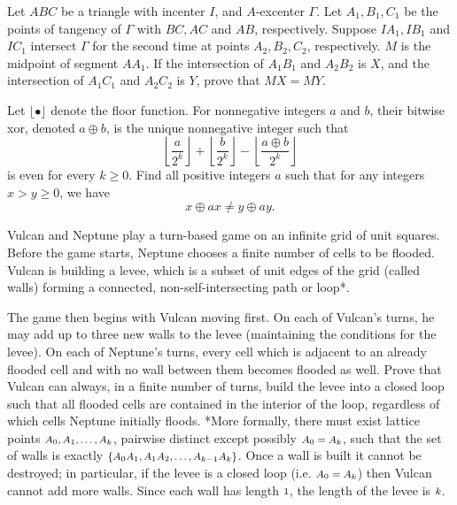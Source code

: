 \documentclass[11pt]{scrartcl}
\begin{document}
\begin{problem}[791423398948046269]
Let $ABC$ be a triangle with incenter $I$, and $A$-excenter $\Gamma$. Let $A_1,B_1,C_1$ be the points of tangency of $\Gamma$ with $BC,AC$ and $AB$, respectively. Suppose $IA_1, IB_1$ and $IC_1$ intersect $\Gamma$ for the second time at points $A_2,B_2,C_2$, respectively. $M$ is the midpoint of segment $AA_1$. If the intersection of $A_1B_1$ and $A_2B_2$ is $X$, and the intersection of $A_1C_1$ and $A_2C_2$ is $Y$, prove that $MX=MY$.
\end{problem}
\begin{problem}[3780160396229984886]
	Let $\lfloor \bullet \rfloor$ denote the floor function. For nonnegative integers $a$ and $b$, their bitwise xor, denoted $a \oplus b$, is the unique nonnegative integer such that$$ \left \lfloor \frac{a}{2^k}  \right \rfloor+ \left\lfloor\frac{b}{2^k} \right\rfloor - \left\lfloor \frac{a\oplus b}{2^k}\right\rfloor$$is even for every $k \ge 0$. Find all positive integers $a$ such that for any integers $x>y\ge 0$, we have\[ x\oplus ax \neq y \oplus ay. \]
\end{problem}
\begin{problem}[6064010778487493566]
Vulcan and Neptune play a turn-based game on an infinite grid of unit squares. Before the game starts, Neptune chooses a finite number of cells to be flooded. Vulcan is building a levee, which is a subset of unit edges of the grid (called walls) forming a connected, non-self-intersecting path or loop*.

The game then begins with Vulcan moving first. On each of Vulcan’s turns, he may add up to three new walls to the levee (maintaining the conditions for the levee). On each of Neptune’s turns, every cell which is adjacent to an already flooded cell and with no wall between them becomes flooded as well. Prove that Vulcan can always, in a finite number of turns, build the levee into a closed loop such that all flooded cells are contained in the interior of the loop, regardless of which cells Neptune initially floods.
*More formally, there must exist lattice points $\mbox{\footnotesize \(A_0, A_1, \dotsc, A_k\)}$, pairwise distinct except possibly $\mbox{\footnotesize \(A_0 = A_k\)}$, such that the set of walls is exactly $\mbox{\footnotesize \(\{A_0A_1, A_1A_2, \dotsc , A_{k-1}A_k\}\)}$. Once a wall is built it cannot be destroyed; in particular, if the levee is a closed loop (i.e. $\mbox{\footnotesize \(A_0 = A_k\)}$) then Vulcan cannot add more walls. Since each wall has length $\mbox{\footnotesize \(1\)}$, the length of the levee is $\mbox{\footnotesize \(k\)}$.
\end{problem}
\end{document}
